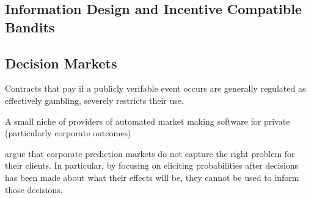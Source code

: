 \subsection{Information Design and Incentive Compatible Bandits}



 \cite{mansour2015bayesian}





\subsection{Decision Markets}

Contracts that pay if a publicly verifable event occurs are generally regulated as effectively gambling,  severely restricts their use. 

A small  niche of providers of automated market making software for private (particularly corporate outcomes)



\cite{berg2003prediction,hanson2002decision,othman2010decision,boutilier2012eliciting,chen2014eliciting}



\cite{othman2010decision} argue that corporate prediction markets do not capture the right problem for their clients.
In particular, by focusing on eliciting probabilities after decisions has been made about what their effects will be, they cannot be used to inform those decisions. 

